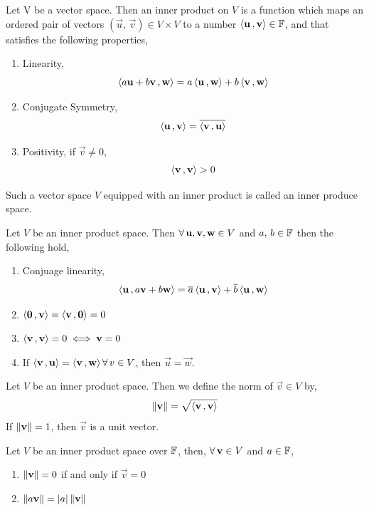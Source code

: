 \documentclass{article}
\begin{document}
\begin{ndefi}
  Let V be a vector space. Then an inner product on $V$ is a function which maps an ordered pair of vectors $(\vec u,\, \vec v)\in V\times V$ to a number $\ip {\vec u} {\vec v }\in\F$, and that satisfies the following properties,
  \begin{enumerate}
    \item Linearity,
    $$ \ip{a\vec u + b\vec v}{\vec w} = a\ip{\vec u}{\vec w} + b\ip{\vec v}{\vec w} $$
    \item Conjugate Symmetry,
    $$ \ip{\vec u}{\vec v} = \overline{\ip{\vec v}{\vec u}} $$
    \item Positivity, if $\vec v\ne 0$,
    $$ \ip{\vec v}{\vec v} > 0 $$
  \end{enumerate}
  Such a vector space $V$ equipped with an inner product is called an inner produce space.
\end{ndefi}


\begin{nlemma}
  Let $V$ be an inner product space. Then $\fa \vec u,\vec v, \vec w \in V$ and $a,\, b\in\F$ then the following hold,
  \begin{enumerate}
    \item Conjuage linearity,
    $$ \ip{\vec u}{a\vec v + b\vec w} = \overline{a}\ip{\vec u}{\vec v} + \overline{b}\ip{\vec u}{\vec w} $$
    \item $\displaystyle{\ip{\vec 0}{\vec v} = \ip{\vec v}{\vec 0} = 0}$
    \item $\displaystyle{\ip{\vec v}{\vec v} = 0 \iff \vec v = 0}$
    \item If $\ip{\vec v}{\vec u} = \ip{\vec v}{\vec w} \fa v\in V$, then $\vec u = \vec w$.
  \end{enumerate}
\end{nlemma}

\begin{ndefi}
  Let $V$ be an inner product space. Then we define the norm of $\vec v\in V$ by,
  $$ \norm{\vec v} = \sqrt{\ip{\vec v}{\vec v}} $$
  If $\norm{\vec v} = 1$, then $\vec v$ is a unit vector.
\end{ndefi}

\begin{nlemma}
  Let $V$ be an inner product space over $\F$, then, $\fa \vec v\in V$ and $a\in\F$,
  \begin{enumerate}
    \item $\norm{\vec v}= 0$ if and only if $\vec v = 0$
    \item $\norm{a\vec v} = |a|\norm{\vec v}$
  \end{enumerate}
\end{nlemma}
\end{document}

